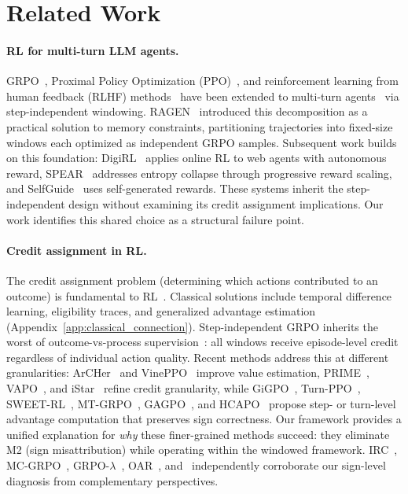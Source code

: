 \section{Related Work}
\label{sec:related_work}

\paragraph{RL for multi-turn LLM agents.}
GRPO~\citep{shao2024deepseekmath}, Proximal Policy Optimization (PPO)~\citep{schulman2017ppo}, and reinforcement learning from human feedback (RLHF) methods~\citep{ouyang2022instructgpt,rafailov2023dpo} have been extended to multi-turn agents~\citep{yao2023react,ragen2025} via step-independent windowing. RAGEN~\citep{ragen2025} introduced this decomposition as a practical solution to memory constraints, partitioning trajectories into fixed-size windows each optimized as independent GRPO samples. Subsequent work builds on this foundation: DigiRL~\citep{digiRL2024} applies online RL to web agents with autonomous reward, SPEAR~\citep{spear2025} addresses entropy collapse through progressive reward scaling, and SelfGuide~\citep{selfguide2026} uses self-generated rewards. These systems inherit the step-independent design without examining its credit assignment implications. Our work identifies this shared choice as a structural failure point.

\paragraph{Credit assignment in RL.}
The credit assignment problem (determining which actions contributed to an outcome) is fundamental to RL~\citep{sutton1988td,williams1992reinforce}. Classical solutions include temporal difference learning, eligibility traces, and generalized advantage estimation~\citep{schulman2016gae} (Appendix~\ref{app:classical_connection}). Step-independent GRPO inherits the worst of outcome-vs-process supervision~\citep{lightman2024lets}: all windows receive episode-level credit regardless of individual action quality. Recent methods address this at different granularities: ArCHer~\citep{zhou2024archer} and VinePPO~\citep{kazemnejad2024vineppo} improve value estimation, PRIME~\citep{prime2025}, VAPO~\citep{vapo2025}, and iStar~\citep{istar2025} refine credit granularity, while GiGPO~\citep{feng2025gigpo}, Turn-PPO~\citep{turnppo2025}, SWEET-RL~\citep{sweetrl2025}, MT-GRPO~\citep{mtgrpo2025}, GAGPO~\citep{gagpo2026}, and HCAPO~\citep{hcapo2026} propose step- or turn-level advantage computation that preserves sign correctness. Our framework provides a unified explanation for \textit{why} these finer-grained methods succeed: they eliminate M2 (sign misattribution) while operating within the windowed framework. IRC~\citep{irc2026}, MC-GRPO~\citep{mcgrpo2026}, GRPO-$\lambda$~\citep{grpolambda2025}, OAR~\citep{oar2026}, and~\citet{gradientcoupling2025} independently corroborate our sign-level diagnosis from complementary perspectives.

